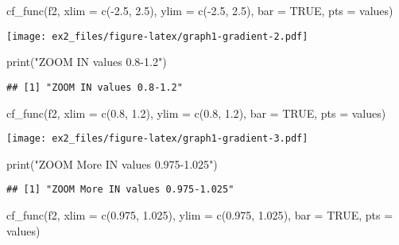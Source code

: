 \documentclass[
]{article}
\newenvironment{Shaded}{\begin{snugshade}}{\end{snugshade}}
\newcommand{\AttributeTok}[1]{\textcolor[rgb]{0.77,0.63,0.00}{#1}}
\newcommand{\ConstantTok}[1]{\textcolor[rgb]{0.00,0.00,0.00}{#1}}
\newcommand{\FloatTok}[1]{\textcolor[rgb]{0.00,0.00,0.81}{#1}}
\newcommand{\FunctionTok}[1]{\textcolor[rgb]{0.00,0.00,0.00}{#1}}
\newcommand{\NormalTok}[1]{#1}
\newcommand{\SpecialCharTok}[1]{\textcolor[rgb]{0.00,0.00,0.00}{#1}}
\newcommand{\StringTok}[1]{\textcolor[rgb]{0.31,0.60,0.02}{#1}}
\begin{document}
\begin{Shaded}
\begin{Highlighting}[]
\FunctionTok{cf\_func}\NormalTok{(f2, }\AttributeTok{xlim =} \FunctionTok{c}\NormalTok{(}\SpecialCharTok{{-}}\FloatTok{2.5}\NormalTok{, }\FloatTok{2.5}\NormalTok{), }\AttributeTok{ylim =} \FunctionTok{c}\NormalTok{(}\SpecialCharTok{{-}}\FloatTok{2.5}\NormalTok{, }\FloatTok{2.5}\NormalTok{), }\AttributeTok{bar =} \ConstantTok{TRUE}\NormalTok{, }\AttributeTok{pts =}\NormalTok{ values)}
\end{Highlighting}
\end{Shaded}

\texttt{[image: ex2\_files/figure-latex/graph1-gradient-2.pdf]}

\begin{Shaded}
\begin{Highlighting}[]
\FunctionTok{print}\NormalTok{(}\StringTok{"ZOOM IN values 0.8{-}1.2"}\NormalTok{)}
\end{Highlighting}
\end{Shaded}

\begin{verbatim}
## [1] "ZOOM IN values 0.8-1.2"
\end{verbatim}

\begin{Shaded}
\begin{Highlighting}[]
\FunctionTok{cf\_func}\NormalTok{(f2, }\AttributeTok{xlim =} \FunctionTok{c}\NormalTok{(}\FloatTok{0.8}\NormalTok{, }\FloatTok{1.2}\NormalTok{), }\AttributeTok{ylim =} \FunctionTok{c}\NormalTok{(}\FloatTok{0.8}\NormalTok{, }\FloatTok{1.2}\NormalTok{), }\AttributeTok{bar =} \ConstantTok{TRUE}\NormalTok{, }\AttributeTok{pts =}\NormalTok{ values)}
\end{Highlighting}
\end{Shaded}

\texttt{[image: ex2\_files/figure-latex/graph1-gradient-3.pdf]}

\begin{Shaded}
\begin{Highlighting}[]
\FunctionTok{print}\NormalTok{(}\StringTok{"ZOOM More IN values 0.975{-}1.025"}\NormalTok{)}
\end{Highlighting}
\end{Shaded}

\begin{verbatim}
## [1] "ZOOM More IN values 0.975-1.025"
\end{verbatim}

\begin{Shaded}
\begin{Highlighting}[]
\FunctionTok{cf\_func}\NormalTok{(f2, }\AttributeTok{xlim =} \FunctionTok{c}\NormalTok{(}\FloatTok{0.975}\NormalTok{, }\FloatTok{1.025}\NormalTok{), }\AttributeTok{ylim =} \FunctionTok{c}\NormalTok{(}\FloatTok{0.975}\NormalTok{, }\FloatTok{1.025}\NormalTok{), }\AttributeTok{bar =} \ConstantTok{TRUE}\NormalTok{, }\AttributeTok{pts =}\NormalTok{ values)}
\end{Highlighting}
\end{Shaded}
\end{document}
